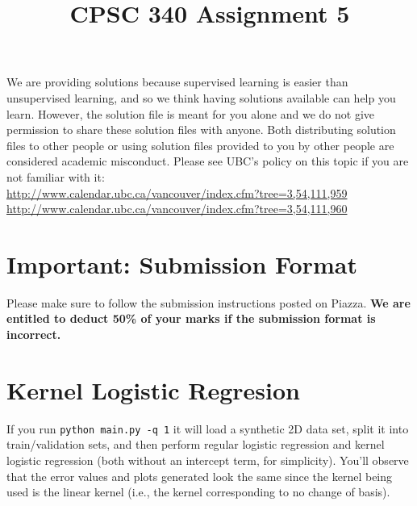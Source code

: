 \documentclass{article}
\def\gre#1{{\color{gre}#1}}
\def\red#1{{\color{red}#1}}
\begin{document}
\title{CPSC 340 Assignment 5}
\date{}
\maketitle

\vspace{-7em}


\red{We are providing solutions because supervised learning is easier than unsupervised learning, and so we think having solutions available can help you learn. However, the solution file is meant for you alone and we do not give permission to share these solution files with anyone. Both distributing solution files to other people or using solution files provided to you by other people are considered academic misconduct. Please see UBC's policy on this topic if you are not familiar with it:\\
\url{http://www.calendar.ubc.ca/vancouver/index.cfm?tree=3,54,111,959}\\
\url{http://www.calendar.ubc.ca/vancouver/index.cfm?tree=3,54,111,960}}

\section*{Important: Submission Format}

Please make sure to follow the submission instructions posted on Piazza. \textbf{We are entitled to deduct 50\% of your marks if the submission format is incorrect.}


\vspace{1em}


\section{Kernel Logistic Regresion}

If you run \verb|python main.py -q 1| it will load a synthetic 2D data set, split it into train/validation sets, and then perform regular logistic regression and kernel logistic regression (both without an intercept term, for simplicity). You'll observe that the error values and plots generated look the same since the kernel being used is the linear kernel (i.e., the kernel corresponding to no change of basis).
\end{document}
